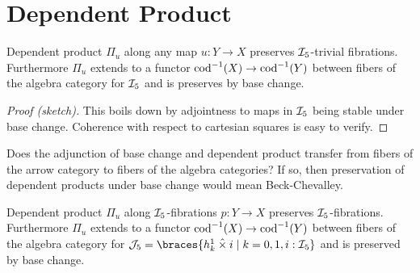 \documentclass[reqno,10pt,a4paper,oneside]{amsart}
\begin{document}
\section*{Dependent Product}

\begin{lemma}
Dependent product $\Pi_u$ along any map $u : Y \to X$ preserves $\cal{I}_5$-trivial fibrations.
Furthermore $\Pi_u$ extends to a functor $\cod^{-1}(X) \to \cod^{-1}(Y)$ between fibers of the algebra category for $\cal{I}_5$ and is preserves by base change.
\end{lemma}

\begin{proof}[Proof (sketch)]
This boils down by adjointness to maps in $\cal{I}_5$ being stable under base change.
Coherence with respect to cartesian squares is easy to verify.
\begin{comment}
Fix an arbitrary map $u : Y \to X$ and let $q : Z \to Y$ be a uniform trivial fibration.
We want to show that $\Pi_u q : \Pi_u Z \to Y$ is a uniform trivial fibration.
Coherently solving a lifting problem $(s, t) : i \to \Pi_u q$ with $i : \cal{I}$ is equivalent to coherently solving $u^*(i) \pitchfork q$ where $u^*(i) : u^* A \to u^* B$.

\[
\xymatrix{
  A'''
  \ar[rr]
  \ar[dd]
  \ar[dr]
&&
  A''
  \ar[rr]
  \ar[dd]
  \ar[dr]
&&
  Z
  \ar[dd]
\\&
  A'
  \ar[rr]
  \ar[dd]
  \pullback{dr}
&&
  A
  \ar[rr]
  \ar[dd]
&&
  \Pi_u Z
  \ar[dd]
\\
  B'''
  \ar[rr]
  \ar[dr]
&&
  B''
  \ar[rr]
  \ar[dr]
&&
  Y
  \ar[dr]
\\&
  \Delta^{n'}
  \ar[rr]
&&
  \Delta^n
  \ar[rr]
&&
  X
}
\]
\end{comment}
\end{proof}

\begin{question}
Does the adjunction of base change and dependent product transfer from fibers of the arrow category to fibers of the algebra categories?
If so, then preservation of dependent products under base change would mean Beck-Chevalley.
\end{question}

\begin{lemma}
Dependent product $\Pi_u$ along $\cal{I}_5$-fibrations $p : Y \to X$ preserves $\cal{I}_5$-fibrations.
Furthermore $\Pi_u$ extends to a functor $\cod^{-1}(X) \to \cod^{-1}(Y)$ between fibers of the algebra category for $\cal{J}_5 = \braces{h_k^1 \hattimes i \mid k = 0, 1, i : \cal{I}_5}$ and is preserved by base change.
\end{lemma}
\end{document}
